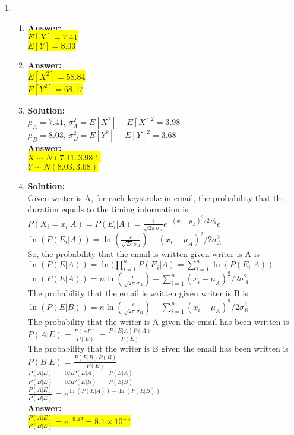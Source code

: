 \documentclass{article}
\newcommand{\myansw}{\textbf{Answer:}\\}
\newcommand{\mysolu}{\textbf{Solution:}\\}
\begin{document}
\begin{enumerate}
	\item
	\begin{enumerate}
		\item
		\myansw
		\colorbox{yellow}{${E[X] = 7.41}$}\\
		\colorbox{yellow}{${E[Y] = 8.03}$}\\
		\item
		\myansw
		\colorbox{yellow}{${E[X^2] = 58.84}$}\\
		\colorbox{yellow}{${E[Y^2] = 68.17}$}\\	
		\item
		\mysolu
		${\mu_A = 7.41}$,	${\sigma_A^2 = E[X^2] - E[X]^2 =  3.98}$\\
		${\mu_B = 8.03}$,	${\sigma_B^2 = E[Y^2] - E[Y]^2 = 3.68}$\\
		\myansw
		\colorbox{yellow}{${X \sim N(7.41, 3.98)}$}\\
		\colorbox{yellow}{${Y \sim N(8.03, 3.68)}$}\\
		\item
		\mysolu
		Given writer is A, for each keystroke in email, the probability that the duration equals to the timing information is
		${P(X_i = x_i|A) =P(E_i|A)= \frac{1}{\sqrt{2\pi}\sigma_A}e^{-(x_i - \mu_A)^2/2\sigma_A^2}\epsilon}$ \\
		${\ln(P(E_i|A)) = \ln(\frac{\epsilon}{\sqrt{2\pi}\sigma_A})-(x_i - \mu_A)^2/2\sigma_A^2}$\\
		So, the probability that the email is written given writer is A is\\
		${\ln(P(E|A)) = \ln(\prod\limits_{i = 1}^{n}P(E_i|A)= \sum\limits_{i = 1}^{n}\ln(P(E_i|A))}$\\
		${\ln(P(E|A)) = n\ln(\frac{\epsilon}{\sqrt{2\pi}\sigma_A}) - \sum\limits_{i = 1}^{n}(x_i - \mu_A)^2/2\sigma_A^2}$\\
		The probability that the email is written given writer is B is\\
		${\ln(P(E|B)) = n\ln(\frac{\epsilon}{\sqrt{2\pi}\sigma_B}) - \sum\limits_{i = 1}^{n}(x_i - \mu_A)^2/2\sigma_B^2}$\\
		
		The probability that the writer is A given the email has been written is\\
		${P(A|E) = \frac{P(AE)}{P(E)}=\frac{P(E|A)P(A)}{P(E)}}$\\
		The probability that the writer is B given the email has been written is\\
		${P(B|E) = \frac{P(E|B)P(B)}{P(E)}}$\\
		${\frac{P(A|E)}{P(B|E)} = \frac{0.5P(E|A)}{0.5P(E|B)} = \frac{P(E|A)}{P(E|B)}}$\\
		${\frac{P(A|E)}{P(B|E)} = e^{\ln(P(E|A))-\ln(P(E|B))}}$\\
		\myansw
		
		\colorbox{yellow}{${\frac{P(A|E)}{P(B|E)} = e^{-9.42} = 8.1 \times 10^{-5}}$}\\
		
	\end{enumerate}

	
	

	
	
	
	
	
\end{enumerate}


\newpage
\end{document}
